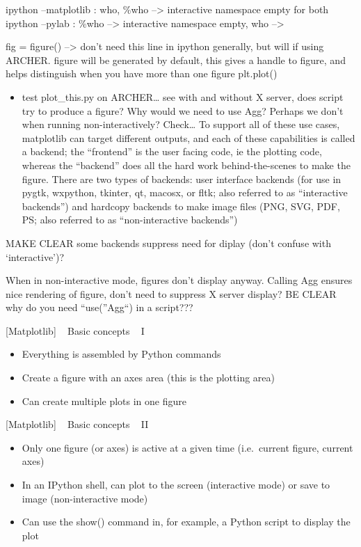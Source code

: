 \documentclass{article}
\begin{document}
ipython --matplotlib : who, \%who --\textgreater{} interactive namespace
empty for both ipython --pylab : \%who --\textgreater{} interactive
namespace empty, who --\textgreater{}

fig = figure() --\textgreater{} don't need this line in ipython
generally, but will if using ARCHER. figure will be generated by
default, this gives a handle to figure, and helps distinguish when you
have more than one figure plt.plot()

\begin{itemize}
\itemsep1pt\parskip0pt
\item
  test plot\_this.py on ARCHER\ldots{} see with and without X server,
  does script try to produce a figure? Why would we need to use Agg?
  Perhaps we don't when running non-interactively? Check\ldots{} To
  support all of these use cases, matplotlib can target different
  outputs, and each of these capabilities is called a backend; the
  ``frontend'' is the user facing code, ie the plotting code, whereas
  the ``backend'' does all the hard work behind-the-scenes to make the
  figure. There are two types of backends: user interface backends (for
  use in pygtk, wxpython, tkinter, qt, macosx, or fltk; also referred to
  as ``interactive backends'') and hardcopy backends to make image files
  (PNG, SVG, PDF, PS; also referred to as ``non-interactive backends'')
\end{itemize}

MAKE CLEAR some backends suppress need for diplay (don't confuse with
`interactive')?

When in non-interactive mode, figures don't display anyway. Calling Agg
ensures nice rendering of figure, don't need to suppress X server
display? BE CLEAR why do you need ``use(''Agg``) in a script???

    {[}Matplotlib{]} ~ Basic concepts ~ I

\begin{itemize}
\item
  Everything is assembled by Python commands
\item
  Create a figure with an axes area (this is the plotting area)
\item
  Can create multiple plots in one figure
\end{itemize}

    {[}Matplotlib{]} ~ Basic concepts ~ II

\begin{itemize}
\item
  Only one figure (or axes) is active at a given time (i.e.~current
  figure, current axes)
\item
  In an IPython shell, can plot to the screen (interactive mode) or save
  to image (non-interactive mode)
\item
  Can use the show() command in, for example, a Python script to display
  the plot
\end{itemize}
\end{document}
